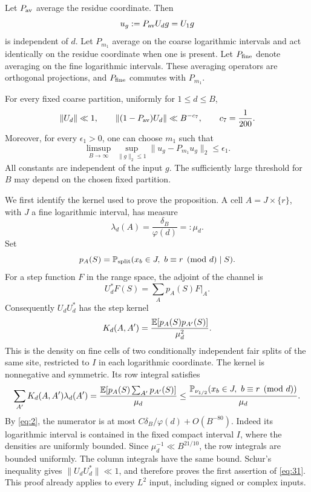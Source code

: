 Let \(P_{\rm av}\) average the residue coordinate.  Then
\[
 u_g:=P_{\rm av}U_dg=U_1g
\]
is independent of \(d\).  Let \(P_{m_1}\) average on the coarse logarithmic
intervals and act identically on the residue coordinate when one is
present.  Let \(P_{\rm fine}\) denote averaging on the fine logarithmic
intervals.  These averaging operators are orthogonal projections, and
\(P_{\rm fine}\) commutes with \(P_{m_1}\).

\begin{proposition}\label{prop:channels-operators}
For every fixed coarse partition, uniformly for \(1\le d\le B\),
\begin{equation}\label{eq:31}
 \|U_d\|\ll 1,\qquad
 \|(1-P_{\rm av})U_d\|\ll B^{-c_7},
 \qquad c_7=\frac1{200}.
\end{equation}
Moreover, for every \(\epsilon_1>0\), one can choose \(m_1\) such that
\begin{equation}\label{eq:32}
 \limsup_{B\to\infty}\ 
 \sup_{\|g\|_2\le1}\|u_g-P_{m_1}u_g\|_2\le\epsilon_1 .
\end{equation}
All constants are independent of the input \(g\).  The sufficiently
large threshold for \(B\) may depend on the chosen fixed partition.
\end{proposition}

We first identify the kernel used to prove the proposition.  A cell
\(A=J\times\{r\}\), with \(J\) a fine logarithmic interval, has measure
\[
 \lambda_d(A)=\frac{\delta_B}{\varphi(d)}=:\mu_d.
\]
Set
\[
 p_A(S)=\Prob_{\rm split}(x_b\in J,\ b\equiv r\pmod d\mid S).
\]
For a step function \(F\) in the range space, the adjoint of the channel is
\[
 U_d^*F(S)=\sum_A p_A(S)F|_A.
\]
Consequently \(U_dU_d^*\) has the step kernel
\begin{equation}\label{eq:channels-joint-kernel}
 K_d(A,A')=\frac{\mathbb E[p_A(S)p_{A'}(S)]}{\mu_d^2}.
\end{equation}
This is the density on fine cells of two conditionally independent fair
splits of the same site, restricted to \(I\) in each logarithmic coordinate.
The kernel is nonnegative and symmetric.  Its row integral satisfies
\[
 \sum_{A'}K_d(A,A')\lambda_d(A')
 =\frac{\mathbb E[p_A(S)\sum_{A'}p_{A'}(S)]}{\mu_d}
 \le\frac{\mathbb P_{\nu_{1/2}}(x_b\in J,\ b\equiv r\pmod d)}{\mu_d}.
\]
By \eqref{eq:2}, the numerator is at most
\(C\delta_B/\varphi(d)+O(B^{-80})\).  Indeed its logarithmic interval
is contained in the fixed compact interval \(I\), where the densities
are uniformly bounded.  Since
\(\mu_d^{-1}\ll B^{21/10}\), the row integrals are bounded uniformly.
The column integrals have the same bound.  Schur's inequality gives
\(\|U_dU_d^*\|\ll1\), and therefore proves the first assertion of
\eqref{eq:31}.  This proof already applies to every \(L^2\) input,
including signed or complex inputs.

